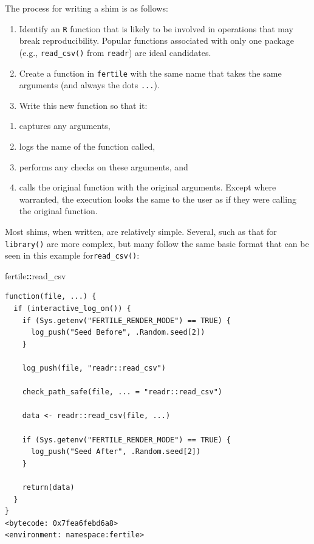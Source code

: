 \documentclass[12pt,twoside]{reedthesis}
\newenvironment{Shaded}{\begin{snugshade}}{\end{snugshade}}
\newcommand{\NormalTok}[1]{#1}
\newcommand{\OperatorTok}[1]{\textcolor[rgb]{0.81,0.36,0.00}{\textbf{#1}}}
\providecommand{\tightlist}{%
  \setlength{\itemsep}{0pt}\setlength{\parskip}{0pt}}
\begin{document}
The process for writing a shim is as follows:
\begin{enumerate}
\def\labelenumi{\arabic{enumi}.}
\item
  Identify an \texttt{R} function that is likely to be involved in operations that may break reproducibility. Popular functions associated with only one package (e.g., \texttt{read\_csv()} from \texttt{readr}) are ideal candidates.
\item
  Create a function in \texttt{fertile} with the same name that takes the same arguments (and always the dots \texttt{...}).
\item
  Write this new function so that it:
\end{enumerate}
\begin{enumerate}
\def\labelenumi{\alph{enumi})}
\tightlist
\item
  captures any arguments,
\item
  logs the name of the function called,
\item
  performs any checks on these arguments, and
\item
  calls the original function with the original arguments. Except where warranted, the execution looks the same to the user as if they were calling the original function.
\end{enumerate}
Most shims, when written, are relatively simple. Several, such as that for \texttt{library()} are more complex, but many follow the same basic format that can be seen in this example for\texttt{read\_csv()}:
\begin{Shaded}
\begin{Highlighting}[]
\NormalTok{fertile}\OperatorTok{::}\NormalTok{read_csv}
\end{Highlighting}
\end{Shaded}
\begin{verbatim}
function(file, ...) {
  if (interactive_log_on()) {
    if (Sys.getenv("FERTILE_RENDER_MODE") == TRUE) {
      log_push("Seed Before", .Random.seed[2])
    }

    log_push(file, "readr::read_csv")

    check_path_safe(file, ... = "readr::read_csv")

    data <- readr::read_csv(file, ...)

    if (Sys.getenv("FERTILE_RENDER_MODE") == TRUE) {
      log_push("Seed After", .Random.seed[2])
    }

    return(data)
  }
}
<bytecode: 0x7fea6febd6a8>
<environment: namespace:fertile>
\end{verbatim}
\end{document}
